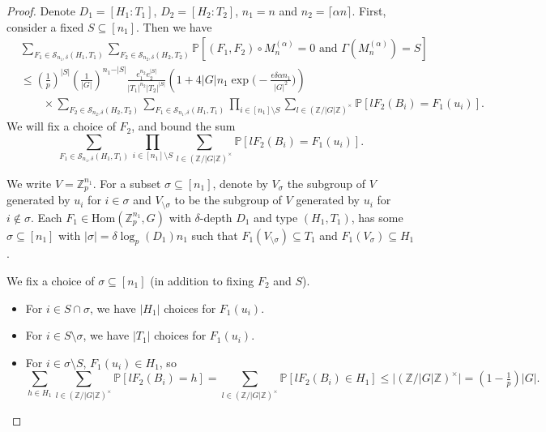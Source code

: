 \documentclass[12pt]{amsart}
\theoremstyle{definition}
\newcommand{\PPP}{\mathbb{P}}
\newcommand{\SSS}[3]{\mathcal{S}_{#1}(#2,#3)}
\newcommand{\Mna}{M_{n}^{(\alpha)}}
\newcommand{\abs}[1]{\vert#1\vert}
\newcommand{\Zp}{\Z_p}
\newcommand{\Z}{\mathbb{Z}}
\newcommand{\Hom}{\text{Hom}}
\newcommand{\ceil}[1]{\lceil#1\rceil}
\begin{document}
\begin{proof}
Denote $D_1=[H_1:T_1]$, $D_2=[H_2:T_2]$, $n_1=n$ and $n_2=\ceil{\alpha n}$.
First, consider a fixed $S\subseteq[n_1]$. Then we have
\begin{align*}
&\sum_{F_1\in \SSS{n_1,\delta}{H_1}{T_1}}
\sum_{F_2\in \SSS{n_2,\delta}{H_2}{T_2}}
\PPP[(F_1,F_2)\circ \Mna=0 \text{ and } \Gamma(\Mna)=S]\\
&\leq (\tfrac{1}{p})^{\abs{S}} (\tfrac{1}{\abs{G}})^{n_1-\abs{S}}
\frac{e_1^{n_2} e_2^{\abs{S}}}{\abs{T_1}^{n_2} \abs{T_2}^{\abs{S}}}
\left(1+4\abs{G}n_1 \exp\Big(-\frac{\epsilon \delta \alpha n_1}{|G|^2}\Big) \right)\\
&\quad\quad\times 
\sum_{F_2\in \SSS{n_2,\delta}{H_2}{T_2}}
\sum_{F_1\in \SSS{n_1,\delta}{H_1}{T_1}}
\prod_{i\in [n_1]\setminus S} \sum_{l\in (\Z/\abs{G}\Z)^{\times}} \PPP[l F_2(B_i)= F_1(u_i)].
\end{align*}
We will fix a choice of $F_2$, and bound the sum
\[
\sum_{F_1\in \SSS{n_1,\delta}{H_1}{T_1}}
\prod_{i\in [n_1]\setminus S} \sum_{l\in (\Z/\abs{G}\Z)^{\times}} \PPP[l F_2(B_i)= F_1(u_i)].
\]

We write $V=\Zp^{n_1}$.
For a subset $\sigma\subseteq[n_1]$, denote by $V_{\sigma}$ the subgroup of $V$ generated by $u_i$ for $i\in \sigma$ and $V_{\setminus \sigma}$ to be the subgroup of $V$ generated by $u_i$ for $i\notin \sigma$.
Each $F_1\in \Hom(\Zp^{n_1},G)$ with $\delta$-depth $D_1$ and type $(H_1, T_1)$, has some $\sigma\subseteq[n_1]$ with $\abs{\sigma}= \delta\log_p(D_1) n_1$ such that $F_1(V_{\setminus \sigma})\subseteq T_1$ and $F_1(V_{\sigma})\subseteq H_1$.

We fix a choice of $\sigma\subseteq [n_1]$ (in addition to fixing $F_2$ and $S$).
\begin{itemize}
    \item For $i\in S\cap \sigma$, we have $\abs{H_1}$ choices for $F_1(u_i)$.
    \item For $i\in S\setminus \sigma$, we have $\abs{T_1}$ choices for $F_1(u_i)$.
    \item For $i\in \sigma\setminus S$, $F_1(u_i)\in H_1$, so
\[
\sum_{h\in H_1}
\sum_{l\in (\Z/\abs{G}\Z)^{\times}} \PPP[l F_2(B_i)= h]
=\sum_{l\in (\Z/\abs{G}\Z)^{\times}} \PPP[l F_2(B_i)\in H_1]
\leq \abs{(\Z/\abs{G}\Z)^{\times}}
=(1-\tfrac{1}{p})\abs{G}.
\]


\end{itemize}
\end{proof}
\end{document}
